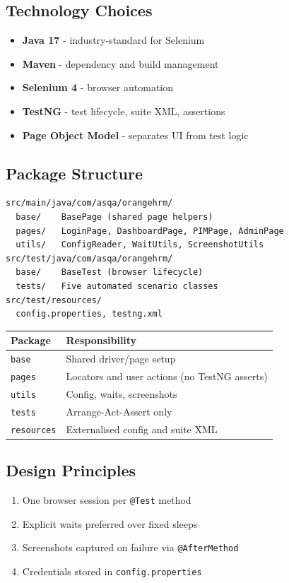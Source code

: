 ﻿\documentclass[11pt,a4paper]{article}
\begin{document}
\subsection{Technology Choices}
\begin{itemize}[noitemsep]
  \item \textbf{Java 17} - industry-standard for Selenium
  \item \textbf{Maven} - dependency and build management
  \item \textbf{Selenium 4} - browser automation
  \item \textbf{TestNG} - test lifecycle, suite XML, assertions
  \item \textbf{Page Object Model} - separates UI from test logic
\end{itemize}

\subsection{Package Structure}
\begin{lstlisting}
src/main/java/com/asqa/orangehrm/
  base/    BasePage (shared page helpers)
  pages/   LoginPage, DashboardPage, PIMPage, AdminPage
  utils/   ConfigReader, WaitUtils, ScreenshotUtils
src/test/java/com/asqa/orangehrm/
  base/    BaseTest (browser lifecycle)
  tests/   Five automated scenario classes
src/test/resources/
  config.properties, testng.xml
\end{lstlisting}

\begin{table}[H]
\centering
\begin{tabular}{@{}lp{9cm}@{}}
\toprule
\textbf{Package} & \textbf{Responsibility} \\
\midrule
\texttt{base} & Shared driver/page setup \\
\texttt{pages} & Locators and user actions (no TestNG asserts) \\
\texttt{utils} & Config, waits, screenshots \\
\texttt{tests} & Arrange-Act-Assert only \\
\texttt{resources} & Externalised config and suite XML \\
\bottomrule
\end{tabular}
\end{table}

\subsection{Design Principles}
\begin{enumerate}[noitemsep]
  \item One browser session per \texttt{@Test} method
  \item Explicit waits preferred over fixed sleeps
  \item Screenshots captured on failure via \texttt{@AfterMethod}
  \item Credentials stored in \texttt{config.properties}
\end{enumerate}
\end{document}
